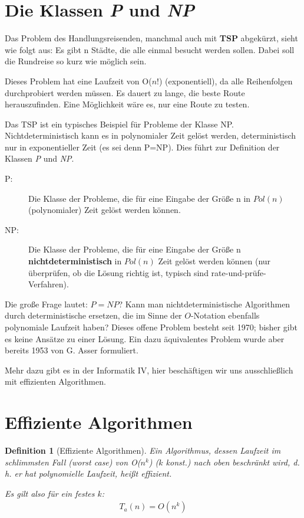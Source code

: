 \documentclass[ngerman]{scrreprt}%
\theoremstyle{break}
\newtheorem{definition}{Definition}
\begin{document}
\section{Die Klassen \textit{P} und \textit{NP}}
Das Problem des Handlungsreisenden, manchmal auch mit \textbf{TSP} abgekürzt, sieht wie folgt aus:
Es gibt n Städte, die alle einmal besucht werden sollen. Dabei soll die
Rundreise so kurz wie möglich sein.

Dieses Problem hat eine Laufzeit von O($n!$) (exponentiell), da alle
Reihenfolgen durchprobiert werden müssen.  Es dauert zu lange, die beste
Route herauszufinden. Eine Möglichkeit wäre es, nur eine Route zu
testen.

Das TSP ist ein typisches Beispiel für Probleme der Klasse NP. 
Nichtdeterministisch kann es in polynomialer Zeit  gelöst werden, 
deterministisch nur in exponentieller Zeit (es sei denn P=NP). Dies führt zur Definition der Klassen \textit {P} und \textit {NP}.

\begin{description}
 \item[P:] Die Klasse der Probleme, die für eine Eingabe der Größe n in
  $Pol(n)$ (polynomialer) Zeit gelöst werden können.
 \item[NP:] Die Klasse der Probleme, die für eine Eingabe der Größe n
  \textbf{nichtdeterministisch} in $Pol(n)$ Zeit gelöst werden können 
  (nur überprüfen, ob die Lösung richtig ist, typisch sind
  rate-und-prüfe-Verfahren).
\end{description}

Die große Frage lautet: $P=NP$? Kann man nichtdeterministische Algorithmen durch deterministische ersetzen,
die im Sinne der $O$-Notation ebenfalls polynomiale Laufzeit haben?
Dieses offene Problem besteht seit 1970; bisher gibt es keine Ansätze zu einer Lösung. Ein
dazu äquivalentes Problem wurde aber bereits 1953 von G. Asser formuliert.

Mehr dazu gibt es in der Informatik IV, hier beschäftigen wir uns ausschließlich mit effizienten Algorithmen.

\section{Effiziente Algorithmen}

\begin{definition}[Effiziente Algorithmen]
  Ein Algorithmus, dessen Laufzeit im schlimmsten Fall (\emph{worst
  case}) von O($n^k$) ($k$ konst.) nach oben beschränkt wird, d.\,h. er hat
  \emph{polynomielle Laufzeit}, heißt effizient.
  
  Es gilt also für ein festes $k$:
  \begin{gather*}
    T_a (n)= O(n^k)     
  \end{gather*}
\end{definition}
\end{document}
